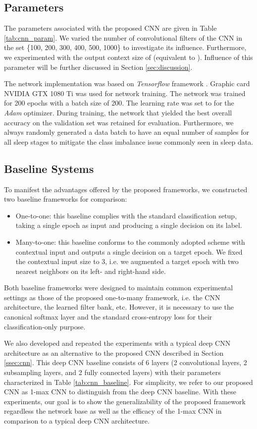 \documentclass[10pt,twocolumn,twoside]{IEEEtran}
\begin{document}
\subsection{Parameters}
The parameters associated with the proposed CNN are given in Table \ref{tab:cnn_param}. We varied the number of convolutional filters  of the CNN in the set \{100, 200, 300, 400, 500, 1000\} to investigate its influence. Furthermore, we experimented with the output context size of  (equivalent to ). Influence of this parameter will be further discussed in Section \ref{sec:discussion}.

The network implementation was based on \emph{Tensorflow} framework \cite{Abadi2016}. Graphic card NVIDIA GTX 1080 Ti was used for network training. The network was trained for 200 epochs with a batch size of 200. The learning rate was set to  for the \emph{Adam} optimizer. During training, the network that yielded the best overall accuracy on the validation set was retained for evaluation. Furthermore, we always randomly generated a data batch to have an equal number of samples for all sleep stages to mitigate the class imbalance issue commonly seen in sleep data.

\subsection{Baseline Systems}
\label{ssec:baseline}
To manifest the advantages offered by the proposed frameworks, we constructed two baseline frameworks for comparison:
\begin{itemize}
\item One-to-one: this baseline complies with the standard classification setup, taking a single epoch as input and producing a single decision on its label. 
\item Many-to-one: this baseline conforms to the commonly adopted scheme with contextual input and outputs a single decision on a target epoch. We fixed the contextual input size to 3, i.e. we augmented a target epoch with two nearest neighbors on its left- and right-hand side. 
\end{itemize}

Both baseline frameworks were designed to maintain common experimental settings as those of the proposed one-to-many framework, i.e. the CNN architecture, the learned filter bank, etc. However, it is necessary to use the canonical softmax layer and the standard cross-entropy loss for their classification-only purpose. 

We also developed and repeated the experiments with a typical deep CNN architecture as an alternative to the proposed CNN described in Section \ref{ssec:cnn}. This deep CNN baseline consists of 6 layers (2 convolutional layers, 2 subsampling layers, and 2 fully connected layers) with their parameters characterized in Table \ref{tab:cnn_baseline}.  For simplicity, we refer to our proposed CNN as 1-max CNN to distinguish from the deep CNN baseline. With these experiments, our goal is to show the generalizability of the proposed framework regardless the network base as well as the efficacy of the 1-max CNN in comparison to a typical deep CNN architecture.
\end{document}
